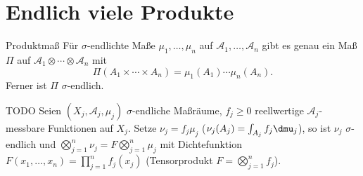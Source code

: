 \section*{Endlich viele Produkte}

\begin{karte}{Produktmaß}
    Für \(\sigma\)-endlichte Maße \( \mu_1, \ldots, \mu_n \) auf 
    \( \mathcal{A}_1, \ldots, \mathcal{A}_n \) gibt es genau ein Maß 
    \(\Pi\) auf \( \mathcal{A}_1 \otimes \cdots \otimes \mathcal{A}_n \)
    mit 
    \[ \Pi(A_1\times \cdots \times A_n) = \mu_1(A_1) \cdots \mu_n(A_n). \]
    Ferner ist \( \Pi \) \(\sigma\)-endlich.
\end{karte}

\begin{karte}{TODO}
    Seien \( (X_j, \mathcal{A}_j, \mu_j) \) \(\sigma\)-endliche Maßräume, 
    \( f_j \geq 0 \) reellwertige \( \mathcal{A}_j \)-messbare Funktionen 
    auf \( X_j \). Setze \( \nu_j = f_j \mu_j \) (\( \nu_j(A_j) = \int_{A_j} f_j \dmu_j \)), 
    so ist \( \nu_j \) \(\sigma\)-endlich und \( \bigotimes_{j=1}^n \nu_j 
    = F \bigotimes_{j=1}^n \mu_j \) mit Dichtefunktion \( F(x_1, \ldots, x_n) = \prod_{j=1}^n f_j(x_j) \) 
    (Tensorprodukt \( F = \bigotimes_{j=1}^n f_j \)).
\end{karte}